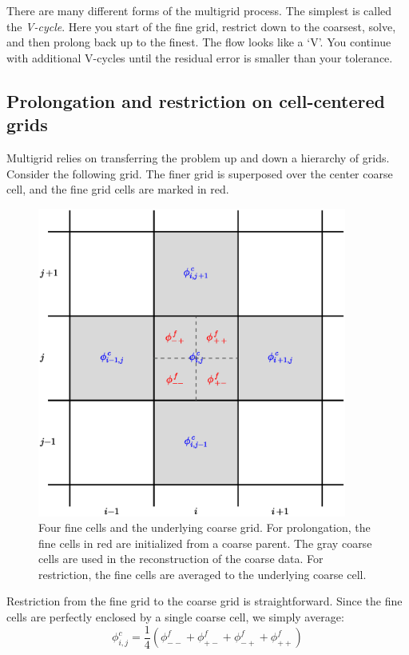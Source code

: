 There are many different forms of the multigrid process.  The simplest 
is called the {\em V-cycle}.  Here you start of the fine grid, restrict
down to the coarsest, solve, and then prolong back up to the finest. 
The flow looks like a `V'.  You continue with additional V-cycles
until the residual error is smaller than your tolerance.

\subsection{Prolongation and restriction on cell-centered grids}

Multigrid relies on transferring the problem up and down a hierarchy of
grids.  Consider the following grid.  The finer grid is superposed over
the center coarse cell, and the fine grid cells are marked in red.

\begin{figure}[h]
\centering
\includegraphics[width=4.0in]{2dgrid-prolong}
\caption[The geometry for 2-d
  prolongation.]{\label{fig:2dgrid-prolong} Four fine cells and the
  underlying coarse grid.  For prolongation, the fine cells in red are
  initialized from a coarse parent.  The gray coarse cells are used in
  the reconstruction of the coarse data.  For restriction, the fine
  cells are averaged to the underlying coarse cell.}
\end{figure}

Restriction from the fine grid to the coarse grid is straightforward.
Since the fine cells are perfectly enclosed by a single coarse cell,
we simply average:
\begin{equation}
\phi_{i,j}^c = \frac{1}{4} ( \phi_{--}^f + \phi_{+-}^f +
                             \phi_{-+}^f + \phi_{++}^f )
\end{equation}


